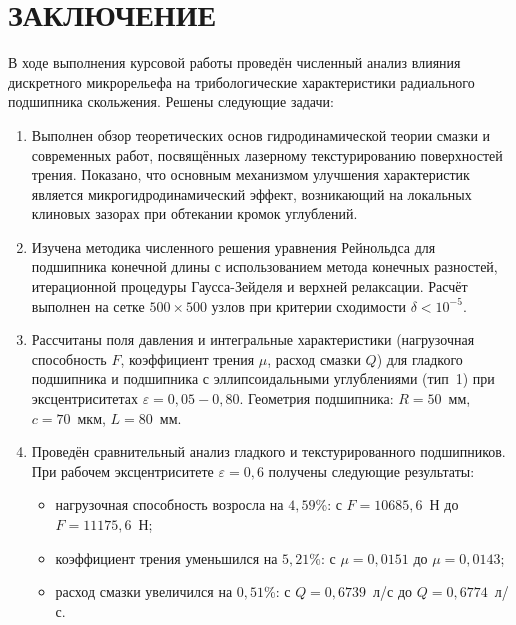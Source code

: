 \section*{ЗАКЛЮЧЕНИЕ}
{}

В ходе выполнения курсовой работы проведён численный анализ влияния дискретного микрорельефа на трибологические характеристики радиального подшипника скольжения. Решены следующие задачи:

\begin{enumerate}
    \item Выполнен обзор теоретических основ гидродинамической теории смазки и современных работ, посвящённых лазерному текстурированию поверхностей трения. Показано, что основным механизмом улучшения характеристик является микрогидродинамический эффект, возникающий на локальных клиновых зазорах при обтекании кромок углублений.

    \item Изучена методика численного решения уравнения Рейнольдса для подшипника конечной длины с использованием метода конечных разностей, итерационной процедуры Гаусса-Зейделя и верхней релаксации. Расчёт выполнен на сетке $500 \times 500$ узлов при критерии сходимости $\delta < 10^{-5}$.

    \item Рассчитаны поля давления и интегральные характеристики (нагрузочная способность $F$, коэффициент трения $\mu$, расход смазки $Q$) для гладкого подшипника и подшипника с эллипсоидальными углублениями (тип~1) при эксцентриситетах $\varepsilon = 0{,}05 - 0{,}80$. Геометрия подшипника: $R = 50$~мм, $c = 70$~мкм, $L = 80$~мм.

    \item Проведён сравнительный анализ гладкого и текстурированного подшипников. При рабочем эксцентриситете $\varepsilon = 0{,}6$ получены следующие результаты:
    \begin{itemize}
        \item нагрузочная способность возросла на $4{,}59$\%: с $F = 10685{,}6$~Н до $F = 11175{,}6$~Н;
        \item коэффициент трения уменьшился на $5{,}21$\%: с $\mu = 0{,}0151$ до $\mu = 0{,}0143$;
        \item расход смазки увеличился на $0{,}51$\%: с $Q = 0{,}6739$~л/с до $Q = 0{,}6774$~л/с.
    \end{itemize}
\end{enumerate}

